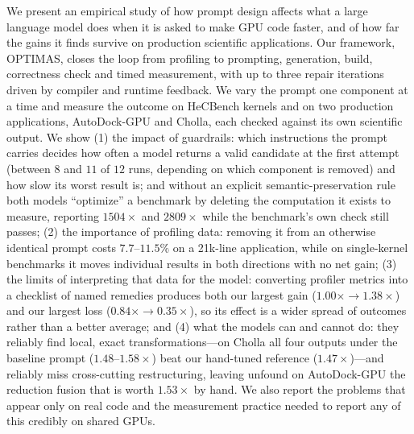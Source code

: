 We present an empirical study of how prompt design affects what a large language model does when it
is asked to make GPU code faster, and of how far the gains it finds survive on production scientific
applications. Our framework, OPTIMAS, closes the loop from profiling to prompting, generation, build,
correctness check and timed measurement, with up to three repair iterations driven by compiler and
runtime feedback. We vary the prompt one component at a time and measure the outcome on HeCBench
kernels and on two production applications, AutoDock-GPU and Cholla, each checked against its own
scientific output. We show (1) the impact of guardrails: which instructions the prompt carries decides
how often a model returns a valid candidate at the first attempt (between $8$ and $11$ of $12$ runs,
depending on which component is removed) and how slow its worst result is; and without an explicit
semantic-preservation rule both models ``optimize'' a benchmark by deleting the computation it exists
to measure, reporting $1504\times$ and $2809\times$ while the benchmark's own check still passes;
(2) the importance of profiling data: removing it from an otherwise identical prompt costs
$7.7$--$11.5\%$ on a 21k-line application, while on single-kernel benchmarks it moves individual
results in both directions with no net gain; (3) the limits of interpreting that data for the model:
converting profiler metrics into a checklist of named remedies produces both our largest gain
($1.00\times \to 1.38\times$) and our largest loss ($0.84\times \to 0.35\times$), so its effect is a
wider spread of outcomes rather than a better average; and (4) what the models can and cannot do:
they reliably find local, exact transformations---on Cholla all four outputs under the baseline
prompt ($1.48$--$1.58\times$) beat our hand-tuned reference ($1.47\times$)---and reliably miss
cross-cutting restructuring, leaving unfound on AutoDock-GPU the reduction fusion that is worth
$1.53\times$ by hand. We also report the problems that appear only on real code and the measurement
practice needed to report any of this credibly on shared GPUs.


